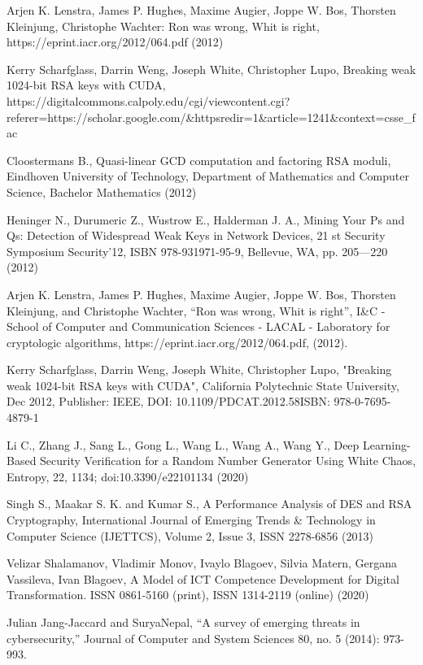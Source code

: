 \documentclass[runningheads]{llncs}
\begin{document}
\begin{thebibliography}{8}

 Arjen K. Lenstra, James P. Hughes, Maxime Augier, Joppe W. Bos, Thorsten Kleinjung, Christophe Wachter: Ron was wrong, Whit is right, https://eprint.iacr.org/2012/064.pdf (2012)

 Kerry Scharfglass, Darrin Weng, Joseph White, Christopher Lupo, Breaking weak 1024-bit RSA keys with CUDA, https://digitalcommons.calpoly.edu/cgi/viewcontent.cgi? referer=https://scholar.google.com/\&httpsredir=1\&article=1241\&context=csse\_fac

 Cloostermans B., Quasi-linear GCD computation and factoring RSA moduli, Eindhoven University of Technology, Department of Mathematics and Computer Science, Bachelor Mathematics (2012)

 Heninger N., Durumeric Z., Wustrow E., Halderman J. A., Mining Your Ps and Qs: Detection of Widespread Weak Keys in Network Devices, 21 st Security Symposium Security’12, ISBN 978-931971-95-9, Bellevue, WA, pp. 205—220 (2012)

 Arjen K. Lenstra, James P. Hughes, Maxime Augier, Joppe W. Bos, Thorsten Kleinjung, and Christophe Wachter, “Ron was wrong, Whit is right”, I\&C - School of Computer and Communication Sciences - LACAL - Laboratory for cryptologic algorithms, https://eprint.iacr.org/2012/064.pdf, (2012).

 Kerry Scharfglass, Darrin Weng, Joseph White, Christopher Lupo, "Breaking weak 1024-bit RSA keys with CUDA", California Polytechnic State University, Dec 2012, Publisher: IEEE, DOI: 10.1109/PDCAT.2012.58ISBN: 978-0-7695-4879-1

 Li C., Zhang J., Sang L., Gong L., Wang L., Wang A., Wang Y., Deep Learning- Based Security Verification for a Random Number Generator Using White Chaos, Entropy, 22, 1134; doi:10.3390/e22101134 (2020)

 Singh S., Maakar S. K. and Kumar S., A Performance Analysis of DES and RSA Cryptography, International Journal of Emerging Trends \& Technology in Computer Science (IJETTCS), Volume 2, Issue 3, ISSN 2278-6856 (2013)

 Velizar Shalamanov, Vladimir Monov, Ivaylo Blagoev, Silvia Matern, Gergana Vassileva, Ivan Blagoev, A Model of ICT Competence Development for Digital Transformation. ISSN 0861-5160 (print), ISSN 1314-2119 (online) (2020)

 Julian Jang-Jaccard and SuryaNepal, “A survey of emerging threats in cybersecurity,” Journal of Computer and System Sciences 80, no. 5 (2014): 973-993. 


\end{thebibliography}
\end{document}
